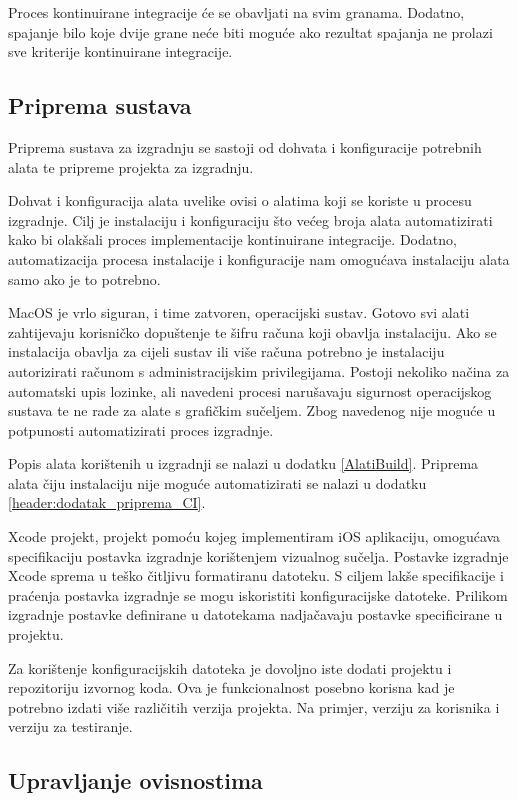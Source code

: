 \documentclass[times, utf8, diplomski, numeric]{fer}
\begin{document}
Proces kontinuirane integracije će se obavljati na svim granama. Dodatno, spajanje bilo koje dvije grane neće biti moguće ako rezultat spajanja ne prolazi sve kriterije kontinuirane integracije.

\subsection{Priprema sustava}

Priprema sustava za izgradnju se sastoji od dohvata i konfiguracije potrebnih alata te pripreme projekta za izgradnju.

Dohvat i konfiguracija alata uvelike ovisi o alatima koji se koriste u procesu izgradnje. Cilj je instalaciju i konfiguraciju što većeg broja alata automatizirati kako bi olakšali proces implementacije kontinuirane integracije. Dodatno, automatizacija procesa instalacije i konfiguracije nam omogućava instalaciju alata samo ako je to potrebno.

MacOS je vrlo siguran, i time zatvoren, operacijski sustav. Gotovo svi alati zahtijevaju korisničko dopuštenje te šifru računa koji obavlja instalaciju. Ako se instalacija obavlja za cijeli sustav ili više računa potrebno je instalaciju autorizirati računom s administracijskim privilegijama. Postoji nekoliko načina za automatski upis lozinke, ali navedeni procesi narušavaju sigurnost operacijskog sustava te ne rade za alate s grafičkim sučeljem. Zbog navedenog nije moguće u potpunosti automatizirati proces izgradnje.

Popis alata korištenih u izgradnji se nalazi u dodatku \ref{AlatiBuild}. Priprema alata čiju instalaciju nije moguće automatizirati se nalazi u dodatku \ref{header:dodatak_priprema_CI}.

Xcode projekt, projekt pomoću kojeg implementiram iOS aplikaciju, omogućava specifikaciju postavka izgradnje korištenjem vizualnog sučelja. Postavke izgradnje Xcode sprema u teško čitljivu formatiranu datoteku. S ciljem lakše specifikacije i praćenja postavka izgradnje se mogu iskoristiti konfiguracijske datoteke. Prilikom izgradnje postavke definirane u datotekama nadjačavaju postavke specificirane u projektu.

Za korištenje konfiguracijskih datoteka je dovoljno iste dodati projektu i repozitoriju izvornog koda. Ova je funkcionalnost posebno korisna kad je potrebno izdati više različitih verzija projekta. Na primjer, verziju za korisnika i verziju za testiranje.

\subsection{Upravljanje ovisnostima}
\end{document}
